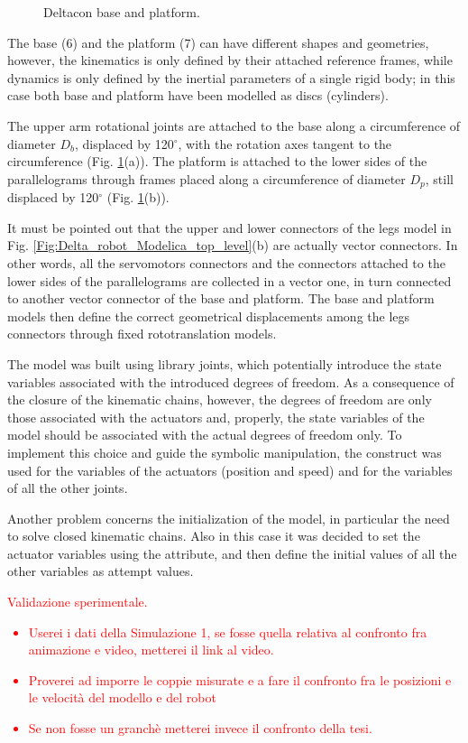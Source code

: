 \documentclass[]{interact}
\theoremstyle{plain}%
\theoremstyle{definition}
\theoremstyle{remark}
\begin{document}
{\begin{figure}
\caption{Deltacon base and platform.} \label{Fig:Deltacon_kinematics_parameters}
\end{figure}
The base (6) and the platform (7) can have different shapes and geometries, however, the kinematics is only defined by their attached reference frames, while dynamics is only defined by the inertial parameters of a single rigid body; in this case both base and platform have been modelled as discs (cylinders).

The upper arm rotational joints are attached to the base along a circumference of diameter $D_b$, displaced by 120$^\circ$, with the rotation axes tangent to the circumference (Fig. \ref{Fig:Deltacon_kinematics_parameters}(a)). The platform is attached to the lower sides of the parallelograms through frames placed along a circumference of diameter $D_p$, still displaced by 120$^\circ$ (Fig. \ref{Fig:Deltacon_kinematics_parameters}(b)).

It must be pointed out that the upper and lower connectors of the legs model in Fig. \ref{Fig:Delta_robot_Modelica_top_level}(b) are actually vector connectors. In other words, all the servomotors connectors and the connectors attached to the lower sides of the parallelograms are collected in a vector one, in turn connected to another vector connector of the base and platform. The base and platform models then define the correct geometrical displacements among the legs connectors through fixed rototranslation models.

The model was built using library joints, which potentially introduce the state variables associated with the introduced degrees of freedom.
As a consequence of the closure of the kinematic chains, however, the degrees of freedom are only those associated with the actuators and, properly, the state variables of the model should be associated with the actual degrees of freedom only.
To implement this choice and guide the symbolic manipulation, the construct  was used for the variables of the actuators (position and speed) and  for the variables of all the other joints.

Another problem concerns the initialization of the model, in particular the need to solve closed kinematic chains.
Also in this case it was decided to set the actuator variables using the  attribute, and then define the initial values of all the other variables as attempt values.

\textcolor{red}{
Validazione sperimentale.
\begin{itemize}
  \item Userei i dati della Simulazione 1, se fosse quella relativa al confronto fra animazione e video, metterei il link al video.
  \item Proverei ad imporre le coppie misurate e a fare il confronto fra le posizioni e le velocit\`{a} del modello e del robot
  \item Se non fosse un granch\`{e} metterei invece il confronto della tesi.
\end{itemize}
}

}
\end{document}
